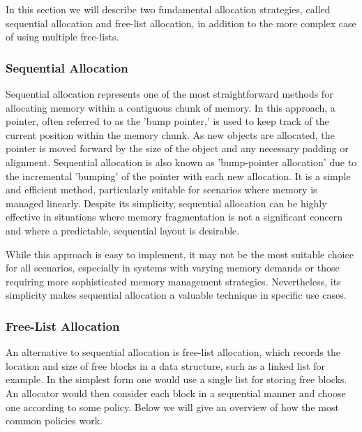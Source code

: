 
In this section we will describe two fundamental allocation strategies, called sequential allocation and free-list allocation, in addition to the more complex case of using multiple free-lists.

\subsubsection{Sequential Allocation}

Sequential allocation represents one of the most straightforward methods for allocating memory within a contiguous chunk of memory. In this approach, a pointer, often referred to as the 'bump pointer,' is used to keep track of the current position within the memory chunk. As new objects are allocated, the pointer is moved forward by the size of the object and any necessary padding or alignment. Sequential allocation is also known as 'bump-pointer allocation' due to the incremental 'bumping' of the pointer with each new allocation. It is a simple and efficient method, particularly suitable for scenarios where memory is managed linearly. Despite its simplicity, sequential allocation can be highly effective in situations where memory fragmentation is not a significant concern and where a predictable, sequential layout is desirable.

While this approach is easy to implement, it may not be the most suitable choice for all scenarios, especially in systems with varying memory demands or those requiring more sophisticated memory management strategies. Nevertheless, its simplicity makes sequential allocation a valuable technique in specific use cases.

\subsubsection{Free-List Allocation}
An alternative to sequential allocation is free-list allocation, which records the location and size of free blocks in a data structure, such as a linked list for example. In the simplest form one would use a single list for storing free blocks. An allocator would then consider each block in a sequential manner and choose one according to some policy. Below we will give an overview of how the most common policies work.

